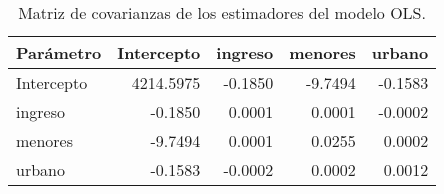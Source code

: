 \begin{table}[H]
    \centering
    \color{blue}
    \caption{Matriz de covarianzas de los estimadores del modelo OLS.}
    \label{tab:covarianzas_parametros}
    \begin{tabular}{lrrrr}
        \toprule
        Parámetro & Intercepto & ingreso & menores & urbano \\
        \midrule
        Intercepto & 4214.5975 & -0.1850 & -9.7494 & -0.1583 \\
        ingreso   & -0.1850   & 0.0001  & 0.0001  & -0.0002 \\
        menores   & -9.7494   & 0.0001  & 0.0255  & 0.0002  \\
        urbano    & -0.1583   & -0.0002 & 0.0002  & 0.0012  \\
        \bottomrule
    \end{tabular}
\end{table}
